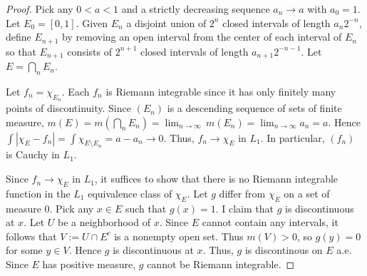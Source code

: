 \documentclass{article}
\begin{document}
\begin{proof}
Pick any $0 < a < 1$ and a strictly decreasing sequence $a_n \to a$ with $a_0 = 1$.  Let $E_0 = [0,1]$. Given $E_n$ a disjoint union of $2^n$ closed intervals of length $a_n 2^{-n}$, define $E_{n+1}$ by removing an open interval from the center of each interval of $E_n$ so that $E_{n+1}$ consists of $2^{n+1}$ closed intervals of length $a_{n+1} 2^{-n-1}$. Let $E = \bigcap_n E_n$.  

Let $f_n = \chi_{E_n}$.  Each $f_n$ is Riemann integrable since it has only finitely many points of discontinuity.  
Since $(E_n)$ is a descending sequence of sets of finite measure,  $m(E) = m(\bigcap_n E_n) = \lim_{n\to\infty} \,m(E_n) =  \lim_{n\to\infty} a_n  = a$.  Hence $\int |\chi_E - f_n| = \int \chi_{E \setminus E_n} = a - a_n \to 0$. Thus, $f_n \to \chi_E$ in $L_1$.  In particular, $(f_n)$ is Cauchy in $L_1$.

Since $f_n \to \chi_E$ in $L_1$, it suffices to show that there is no Riemann integrable function in the $L_1$ equivalence class of $\chi_E$. Let $g$ differ from $\chi_E$ on a set of measure 0.  Pick any $x \in E$ such that $g(x) = 1$.  I claim that $g$ is discontinuous at $x$.  Let $U$ be a neighborhood of $x$.  Since $E$ cannot contain any intervals, it follows that $V := U \cap E^c$ is a nonempty open set.  Thus $m(V) > 0$, so $g(y) = 0$ for some $y \in V$.  Hence $g$ is discontinuous at $x$.  Thus, $g$ is discontinous on $E$ a.e.  Since $E$ has positive measure, $g$ cannot be Riemann integrable.
\end{proof}
\end{document}
